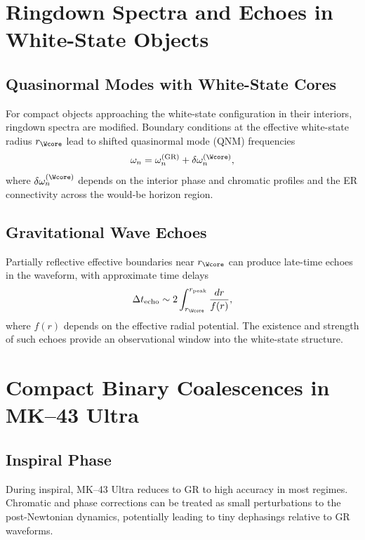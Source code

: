 \chapter{Ringdown Spectra and Echoes in White-State Objects}

\section{Quasinormal Modes with White-State Cores}

For compact objects approaching the white-state configuration in their interiors, ringdown spectra are modified.
Boundary conditions at the effective white-state radius $r_{\Wcore}$ lead to shifted quasinormal mode (QNM) frequencies
\[
\omega_n = \omega_n^{\mathrm{(GR)}} + \delta\omega_n^{(\Wcore)},
\]
where $\delta\omega_n^{(\Wcore)}$ depends on the interior phase and chromatic profiles and the ER connectivity across the would-be horizon region.

\section{Gravitational Wave Echoes}

Partially reflective effective boundaries near $r_{\Wcore}$ can produce late-time echoes in the waveform, with approximate time delays
\[
\Delta t_{\mathrm{echo}} \sim 2\int_{r_{\Wcore}}^{r_{\mathrm{peak}}} \frac{dr}{f(r)},
\]
where $f(r)$ depends on the effective radial potential.
The existence and strength of such echoes provide an observational window into the white-state structure.


\chapter{Compact Binary Coalescences in MK--43 Ultra}

\section{Inspiral Phase}

During inspiral, MK--43 Ultra reduces to GR to high accuracy in most regimes.
Chromatic and phase corrections can be treated as small perturbations to the post-Newtonian dynamics, potentially leading to tiny dephasings relative to GR waveforms.

